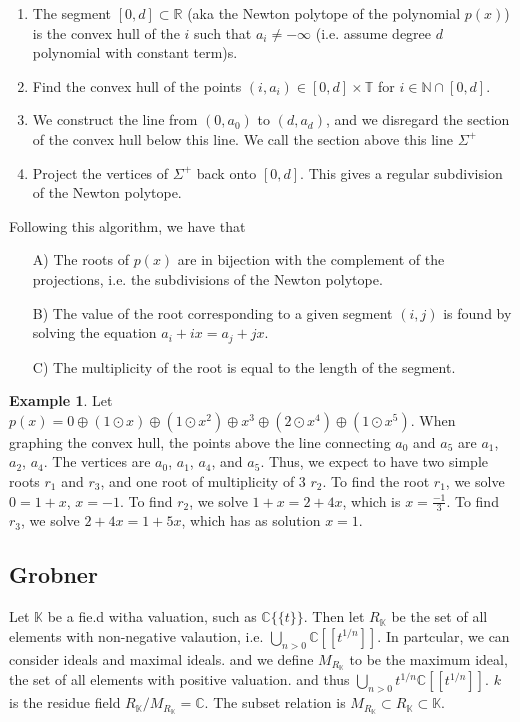 \documentclass[11pt]{article}
\theoremstyle{definition}
\theoremstyle{plain}%
\theoremstyle{definition}
\newtheorem{protoexample}{Example}[section]
\newenvironment{ex}
   {\colorlet{shadecolor}{red!15}\begin{shaded}\begin{protoexample}}
   {\end{protoexample}\end{shaded}}
\def\RR{{\mathbb R}}
\def\KK{{\mathbb K}}
\def\CC{{\mathbb C}}
\def\NN{{\mathbb N}}
\def\TT{{\mathbb T}}
\begin{document}
\begin{enumerate}
    \item The segment $[0,d]\subset \RR$ (aka the Newton polytope of the polynomial $p(x)$) is the convex hull of the $i$ such that $a_i \neq - \infty$ (i.e. assume degree $d$ polynomial with constant term)s.
    \item Find the convex hull of the points $(i,a_i)\in [0,d] \times \TT$ for $i \in \NN \cap [0,d]$.
    \item We construct the line from $(0,a_0)$ to $(d,a_d)$, and we disregard the section of the convex hull below this line. We call the section above this line $\Sigma^+$
    \item Project the vertices of $\Sigma^+$ back onto $[0,d]$. This gives a regular subdivision of the Newton polytope.
\end{enumerate}
Following this algorithm, we have that
\begin{itemize}
    \item [A)] The roots of $p(x)$ are in bijection with the complement of the projections, i.e. the subdivisions of the Newton polytope.
    \item [B)] The value of the root corresponding to a given segment $(i,j)$ is found by solving the equation $a_i + ix = a_j  +jx$.
    \item [C)] The multiplicity of the root is equal to the length of the segment.
\end{itemize}



\begin{ex}
    Let $p(x) = 0 \oplus (1 \odot x) \oplus (1\odot x^2) \oplus x^3 \oplus (2\odot x^4) \oplus (1 \odot x^5)$. When graphing the convex hull, the points above the line connecting $a_0$ and $a_5$ are $a_1$, $a_2$, $a_4$. The vertices are $a_0$, $a_1$, $a_4$, and $a_5$. Thus, we expect to have two simple roots $r_1$ and $r_3$, and one root of multiplicity of $3$ $r_2$. To find the root $r_1$, we solve $0=1+x$, $x=-1$. To find $r_2$, we solve $1+x = 2 + 4x$, which is $x=\frac{-1}{3}$. To find $r_3$, we solve $2 + 4x=1+5x$, which has as solution $x=1$.
\end{ex}





\subsection{Grobner}
Let $\KK$ be a fie.d witha  valuation, such as $\CC\{\{t\}\}$. Then let $R_\KK$ be the set of all elements with non-negative valaution, i.e. $\bigcup \limits_{n >0}\CC[[t^{1/n}]]$. In partcular, we can consider ideals and maximal ideals. and we define $M_{R_\KK}$ to be the maximum ideal, the set of all elements with positive valuation. and thus $\bigcup\limits_{n>0} t^{1/n}\CC[[t^{1/n}]]$. $k$ is the residue field $R_\KK/ M_{R_\KK} = \CC$. The subset relation is $M_{R_\KK} \subset R_\KK \subset \KK$.
\end{document}
